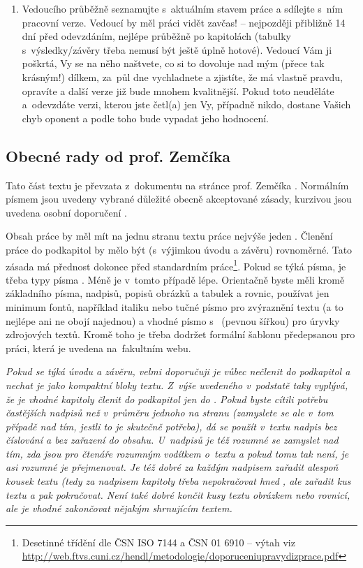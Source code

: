 \begin{enumerate}
	\item{Vedoucího průběžně seznamujte s~aktuálním stavem práce a sdílejte s~ním pracovní verze. Vedoucí by měl práci vidět zavčas! -- nejpozději přibližně 14 dní před odevzdáním, nejlépe průběžně po kapitolách (tabulky s~výsledky/závěry třeba nemusí být ještě úplně hotové). Vedoucí Vám ji poškrtá, Vy se na něho naštvete, co si to dovoluje nad mým (přece tak krásným!) dílkem, za~půl dne vychladnete a zjistíte, že má vlastně pravdu, opravíte a další verze již bude mnohem kvalitnější. Pokud toto neuděláte a~odevzdáte verzi, kterou jste četl(a) jen Vy, případně nikdo, dostane  Vašich chyb oponent a podle toho bude vypadat jeho hodnocení.}
\end{enumerate}


\subsection*{Obecné rady od prof. Zemčíka}
Tato část textu je převzata z~dokumentu na stránce prof. Zemčíka \cite{Zemcik}. Normálním písmem jsou uvedeny vybrané důležité obecně akceptované zásady, kurzivou jsou uvedena osobní doporučení . 

Obsah práce by měl mít na jednu stranu textu práce nejvýše jeden . Členění práce do podkapitol by mělo být (s~výjimkou úvodu a závěru) rovnoměrné. Tato zásada má přednost dokonce před standardním  práce\footnote{Desetinné třídění dle ČSN ISO 7144 a ČSN 01 6910 -- výtah viz \url{http://web.ftvs.cuni.cz/hendl/metodologie/doporuceniupravydizprace.pdf}}. Pokud se týká písma, je třeba typy písma . Méně je v~tomto případě lépe. Orientačně byste měli kromě základního písma, nadpisů, popisů obrázků a tabulek a rovnic, používat jen minimum fontů, například italiku nebo tučné písmo pro zvýraznění textu (a to nejlépe ani ne obojí najednou) a vhodné písmo s~ (pevnou šířkou) pro úryvky zdrojových textů. Kromě toho je třeba dodržet formální šablonu předepsanou pro práci, která je uvedena na~fakultním webu. 

\it Pokud se týká úvodu a závěru, velmi doporučuji je vůbec nečlenit do podkapitol a nechat je jako kompaktní bloky textu. Z~výše uvedeného v~podstatě taky vyplývá, že je vhodné kapitoly členit do podkapitol jen do . Pokud byste cítili potřebu častějších nadpisů než v~průměru jednoho na 
stranu (zamyslete se ale v~tom případě nad tím, jestli to je skutečně potřeba), dá se použít v~textu  nadpis bez číslování a bez zařazení do obsahu. U~nadpisů je též rozumné se zamyslet nad tím, zda jsou pro čtenáře rozumným vodítkem o~textu a pokud tomu tak není, je asi rozumné je přejmenovat. Je též dobré za každým nadpisem zařadit alespoň kousek textu (tedy za nadpisem kapitoly třeba  nepokračovat hned , ale zařadit kus textu a pak pokračovat. Není také dobré končit kusy textu obrázkem nebo rovnicí, ale je vhodné zakončovat nějakým shrnujícím textem. 

